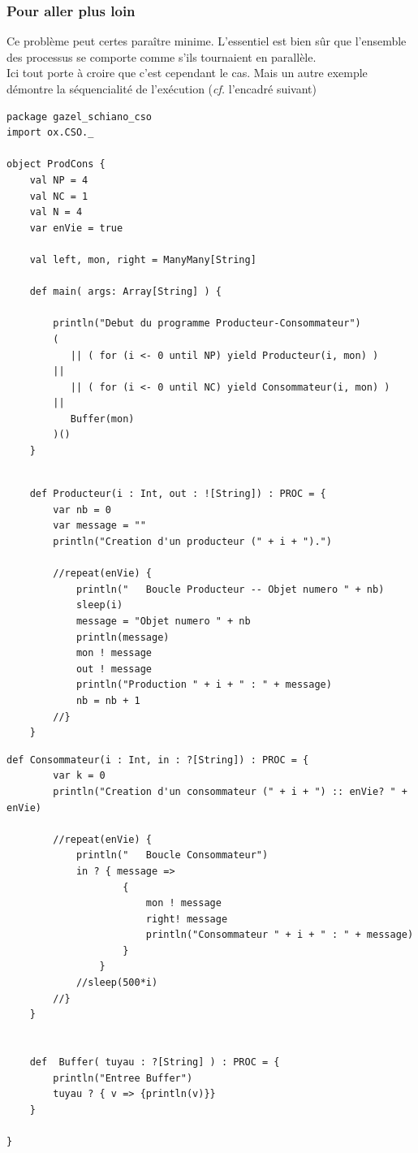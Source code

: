\documentclass[a4paper,11pt,french]{report}
\begin{document}
\subsubsection{Pour aller plus loin}

Ce problème peut certes paraître minime. L'essentiel est bien sûr que l'ensemble des processus se comporte comme s'ils tournaient en parallèle.\\ Ici tout porte à croire que c'est cependant le cas. Mais un autre exemple démontre la séquencialité de l'exécution (\emph{cf.} l'encadré suivant)

\begin{lstlisting}[frame=trBL, title={Contre-exemple démontrant la séquentialité de l'exécution}]
package gazel_schiano_cso
import ox.CSO._

object ProdCons {
    val NP = 4
    val NC = 1
    val N = 4
    var enVie = true

    val left, mon, right = ManyMany[String]

    def main( args: Array[String] ) {
        
        println("Debut du programme Producteur-Consommateur")
        ( 
           || ( for (i <- 0 until NP) yield Producteur(i, mon) )
        || 
           || ( for (i <- 0 until NC) yield Consommateur(i, mon) )
        || 
           Buffer(mon) 
        )()
    }
\end{lstlisting}
\begin{lstlisting}[frame=trBL, title={Contre-exemple, suite : Producteur}, firstnumber=last]    
    
    def Producteur(i : Int, out : ![String]) : PROC = {
        var nb = 0
        var message = ""
        println("Creation d'un producteur (" + i + ").")
        
        //repeat(enVie) {
            println("   Boucle Producteur -- Objet numero " + nb)
            sleep(i)
            message = "Objet numero " + nb
            println(message)
            mon ! message
            out ! message
            println("Production " + i + " : " + message)
            nb = nb + 1
        //}
    }
\end{lstlisting}
\begin{lstlisting}[frame=trBL, title={Contre-exemple, suite : Consommateur et Buffer}, firstnumber=last]
    def Consommateur(i : Int, in : ?[String]) : PROC = {
        var k = 0
        println("Creation d'un consommateur (" + i + ") :: enVie? " + enVie)
        
        //repeat(enVie) {
            println("   Boucle Consommateur")
            in ? { message => 
                    {
                        mon ! message 
                        right! message 
                        println("Consommateur " + i + " : " + message)
                    } 
                }
            //sleep(500*i)
        //}
    }  
    

    def  Buffer( tuyau : ?[String] ) : PROC = {
        println("Entree Buffer")
        tuyau ? { v => {println(v)}}
    }
    
}
\end{lstlisting}
\end{document}
